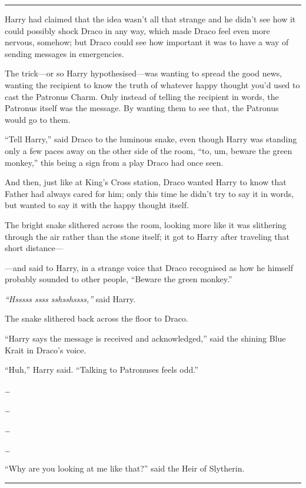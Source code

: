 \begin{center}\rule{3in}{0.4pt}\end{center}

Harry had claimed that the idea wasn't all that strange and he didn't
see how it could possibly shock Draco in any way, which made Draco feel
even more nervous, somehow; but Draco could see how important it was to
have a way of sending messages in emergencies.

The trick---or so Harry hypothesised---was wanting to spread the good
news, wanting the recipient to know the truth of whatever happy thought
you'd used to cast the Patronus Charm. Only instead of telling the
recipient in words, the Patronus itself was the message. By wanting them
to see that, the Patronus would go to them.

``Tell Harry,'' said Draco to the luminous snake, even though Harry was
standing only a few paces away on the other side of the room, ``to, um,
beware the green monkey,'' this being a sign from a play Draco had once
seen.

And then, just like at King's Cross station, Draco wanted Harry to know
that Father had always cared for him; only this time he didn't try to
say it in words, but wanted to say it with the happy thought itself.

The bright snake slithered across the room, looking more like it was
slithering through the air rather than the stone itself; it got to Harry
after traveling that short distance---

---and said to Harry, in a strange voice that Draco recognised as how he
himself probably sounded to other people, ``Beware the green monkey.''

\emph{``Hsssss ssss sshsshssss,''} said Harry.

The snake slithered back across the floor to Draco.

``Harry says the message is received and acknowledged,'' said the
shining Blue Krait in Draco's voice.

``Huh,'' Harry said. ``Talking to Patronuses feels odd.''

\ldots{}

\ldots{}

\ldots{}

\ldots{}

``Why are you looking at me like that?'' said the Heir of Slytherin.

\begin{center}\rule{3in}{0.4pt}\end{center}

